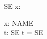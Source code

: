 \documentclass{article}
\begin{document}
\begin{zdirectives}
\end{zdirectives}

\begin{zed}
  [NAME]
\end{zed}
\begin{schema}{SE}
  x: \nat
\end{schema}
\begin{axdef}
  x: NAME \\
  t: SE
\where
  t = \theta SE
\end{axdef}
\end{document}
